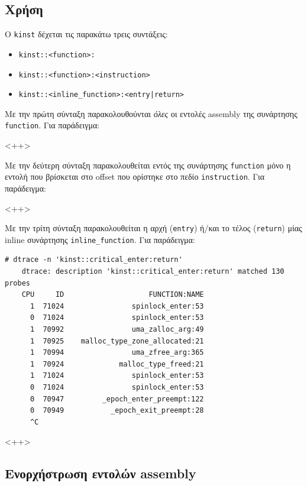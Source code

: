 \documentclass[12pt]{article}
\begin{document}
\subsection{Χρήση}

Ο \lstinline{kinst} δέχεται τις παρακάτω τρεις συντάξεις:

\begin{itemize}
	\item \lstinline{kinst::<function>:}
	\item \lstinline{kinst::<function>:<instruction>}
	\item \lstinline{kinst::<inline_function>:<entry|return>}
\end{itemize}

Με την πρώτη σύνταξη παρακολουθούνται \textit{όλες} οι εντολές assembly της
συνάρτησης \lstinline{function}. Για παράδειγμα:

<++>

Με την δεύτερη σύνταξη παρακολουθείται εντός της συνάρτησης
\lstinline{function} μόνο η εντολή που βρίσκεται στο offset που ορίστηκε στο
πεδίο \lstinline{instruction}. Για παράδειγμα:

<++>

Με την τρίτη σύνταξη παρακολουθείται η αρχή (\lstinline{entry}) ή/και το τέλος
(\lstinline{return}) μίας inline συνάρτησης \lstinline{inline_function}. Για
παράδειγμα:

\begin{lstlisting}[caption={Inline tracing}, captionpos=b]
	# dtrace -n 'kinst::critical_enter:return'
	dtrace: description 'kinst::critical_enter:return' matched 130 probes
	CPU     ID                    FUNCTION:NAME
	  1  71024                spinlock_enter:53
	  0  71024                spinlock_enter:53
	  1  70992                uma_zalloc_arg:49
	  1  70925    malloc_type_zone_allocated:21
	  1  70994                uma_zfree_arg:365
	  1  70924             malloc_type_freed:21
	  1  71024                spinlock_enter:53
	  0  71024                spinlock_enter:53
	  0  70947         _epoch_enter_preempt:122
	  0  70949           _epoch_exit_preempt:28
	  ^C
\end{lstlisting}

<++>

\subsection{Ενορχήστρωση εντολών assembly}

\end{document}
